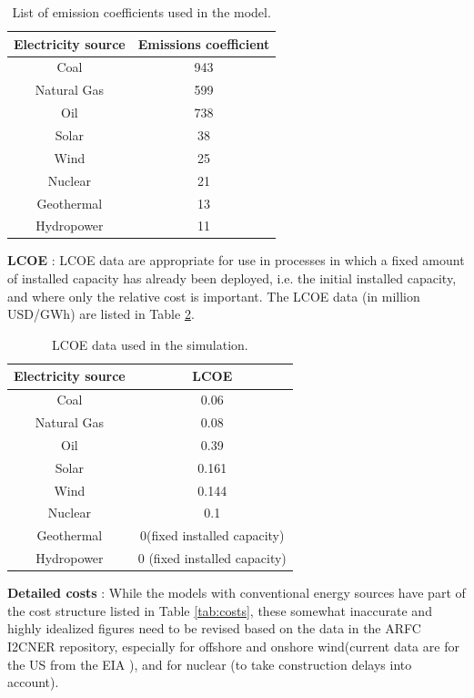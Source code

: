 \documentclass[14pt,a4paper]{article} %
\begin{document}
\begin{table}[H]
\centering
\caption{\label{tab:emi} List of emission coefficients used in the model.}
\vspace{2mm}
\begin{tabular}{|c|c|}
\hline
\textbf{Electricity source} & \textbf{Emissions coefficient}\\
\hline
Coal & 943 \\
\hline
Natural Gas & 599 \\
\hline
Oil & 738 \\
\hline
Solar & 38 \\
\hline
Wind & 25 \\
\hline
Nuclear & 21 \\
\hline
Geothermal & 13 \\
\hline
Hydropower & 11 \\
\hline
\end{tabular}
\end{table}

\textbf{\gls{LCOE}}\cite{noauthor_lazards_2017} : \gls{LCOE} data are appropriate for use in processes in which a fixed amount of installed capacity has already been deployed, i.e. the initial installed capacity, and where only the relative cost is important. The \gls{LCOE} data (in million USD/GWh) are listed in Table \ref{tab:lcoe}. \\

\begin{table}[H]
\centering
\caption{\label{tab:lcoe} \gls{LCOE} data used in the simulation.}
\vspace{2mm}
\begin{tabular}{|c|c|}
\hline
\textbf{Electricity source} & \textbf{LCOE}\\
\hline
Coal & 0.06 \\
\hline
Natural Gas & 0.08 \\
\hline
Oil & 0.39 \\
\hline
Solar & 0.161 \\
\hline
Wind & 0.144 \\
\hline
Nuclear & 0.1 \\
\hline
Geothermal & 0(fixed installed  capacity) \\
\hline
Hydropower & 0 (fixed installed  capacity) \\
\hline
\end{tabular}
\end{table}

\textbf{Detailed costs} \cite{noauthor_eia_2019} : While the models with conventional energy sources have part of the cost structure listed in Table \ref{tab:costs}, these somewhat inaccurate and highly idealized figures need to be revised based on the data in the \gls{ARFC} \gls{I2CNER} repository, especially for offshore and onshore wind(current data are for the US from the \gls{EIA} \cite{noauthor_eia_2019}), and for nuclear (to take construction delays into account).
\end{document}
